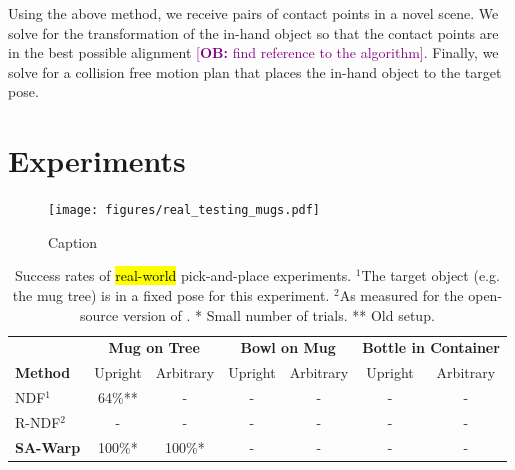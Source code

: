 \documentclass{article}
\newcommand{\ob}[1]{\textcolor{purple}{[\textbf{OB:} #1]}}
\begin{document}
Using the above method, we receive pairs of contact points in a novel scene. We solve for the transformation of the in-hand object so that the contact points are in the best possible alignment \ob{find reference to the algorithm}. Finally, we solve for a collision free motion plan that places the in-hand object to the target pose.

\section{Experiments}

\begin{figure}
    \centering
    \texttt{[image: figures/real\_testing\_mugs.pdf]}
    \caption{Caption}
    \label{fig:my_label}
\end{figure}


\begin{table}[t!]
    \centering
    \begin{tabular}{lcccccc}
        \toprule
          & \multicolumn{2}{c}{\textbf{Mug on Tree}} & \multicolumn{2}{c}{\textbf{Bowl on Mug}} & \multicolumn{2}{c}{\textbf{Bottle in Container}} \\
         \textbf{Method} & Upright & Arbitrary & Upright & Arbitrary & Upright & Arbitrary \\
         \midrule
         NDF$^1$ & 64\%** & - & - & - & - & - \\
         R-NDF$^2$ & - & - & - & - & - & - \\
         \textbf{SA-Warp} & 100\%* & 100\%* & - & - & - & - \\
         \bottomrule
    \end{tabular}
    \caption{Success rates of \hl{real-world} pick-and-place experiments. $^1$The target object (e.g. the mug tree) is in a fixed pose for this experiment. $^2$As measured for the open-source version of \citet{simeonov22Neurala}. * Small number of trials. ** Old setup.}
    \label{tab:real_world}
\end{table}
\end{document}
